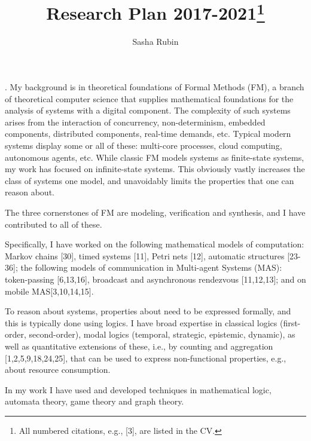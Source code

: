 \documentclass[a4paper]{article}
\title{Research Plan 2017-2021\footnote{All numbered citations, e.g., [3], are listed in the CV.}}
\author{Sasha Rubin}
\date{}
\newcommand{\head}[1]{\noindent {\bf #1}.}
\def\FM{{\sf FM}\xspace}
\def\MAS{{\sf MAS}\xspace}
\def\WASP{{\sf WASP}\xspace}
\begin{document}
\maketitle


\head{Research Background}
My background is in theoretical foundations of Formal Methods (\FM), a branch of theoretical computer
science that supplies mathematical foundations for the analysis of systems with a digital component. The complexity
of such systems arises from the interaction of concurrency, non-determinism, embedded components, distributed components, real-time demands, etc.
Typical modern systems display some or all of these: multi-core processes, cloud computing, autonomous agents, etc.
While classic \FM models systems as finite-state systems, my work has focused on infinite-state systems.
This obviously vastly increases the class of systems one model, and unavoidably limits the properties that one can reason about.

The three cornerstones of \FM are modeling, verification and synthesis, and I have contributed to all of these.


Specifically, I have worked on the following mathematical models of computation:
Markov chains [30], timed systems [11], Petri nets [12], automatic structures [23-36]; 
the following models of communication in Multi-agent Systems (\MAS): token-passing [6,13,16], broadcast and
asynchronous rendezvous [11,12,13]; and on mobile \MAS [3,10,14,15].  

To reason about systems, properties about need to be expressed formally, and this is typically done using logics.
I have broad expertise in classical logics (first-order, second-order), modal logics 
(temporal, strategic, epistemic, dynamic), as well as quantitative extensions of these, i.e., 
by counting and aggregation [1,2,5,9,18,24,25], that can be used to express non-functional properties, e.g., about 
resource consumption.

In my work I have used and developed techniques in mathematical logic,
automata theory, game theory and graph theory.
\end{document}
